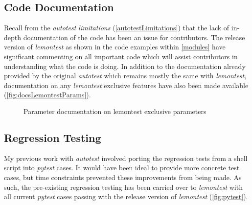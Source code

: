 \documentclass[hidelinks]{report}
\begin{document}
\subsection{Code Documentation}
Recall from the \textit{autotest limitations} (\autoref{autotestLimitations}) that the lack of in-depth documentation of the code has been an issue for contributors. The release version of \textit{lemontest} as shown in the code examples within \autoref{modules} have significant commenting on all important code which will assist contributors in understanding what the code is doing. In addition to the documentation already provided by the original \textit{autotest} which remains mostly the same with \textit{lemontest}, documentation on any \textit{lemontest} exclusive features have also been made available (\autoref{fig:docsLemontestParams}).
\begin{figure}[h]
	\centering
	\caption{Parameter documentation on lemontest exclusive parameters}
	\label{fig:docsLemontestParams}
\end{figure}

\subsection{Regression Testing}
My previous work with \textit{autotest} involved porting the regression tests from a shell script into \textit{pytest} cases. It would have been ideal to provide more concrete test cases, but time constraints prevented these improvements from being made. As such, the pre-existing regression testing has been carried over to \textit{lemontest} with all current \textit{pytest} cases passing with the release version of \textit{lemontest} (\autoref{fig:pytest}).
\end{document}

